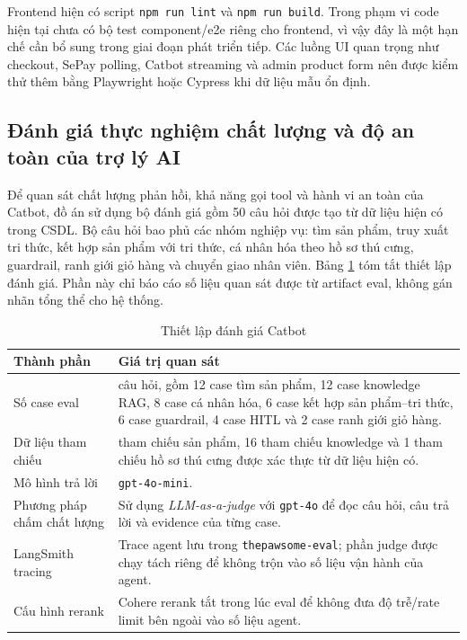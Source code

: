 \documentclass[../DoAn.tex]{subfiles}
\begin{document}
Frontend hiện có script \texttt{npm run lint} và \texttt{npm run build}. Trong phạm vi code hiện tại chưa có bộ test component/e2e riêng cho frontend, vì vậy đây là một hạn chế cần bổ sung trong giai đoạn phát triển tiếp. Các luồng UI quan trọng như checkout, SePay polling, Catbot streaming và admin product form nên được kiểm thử thêm bằng Playwright hoặc Cypress khi dữ liệu mẫu ổn định.

\subsection{Đánh giá thực nghiệm chất lượng và độ an toàn của trợ lý AI}
\label{subsection:4.4.2}

Để quan sát chất lượng phản hồi, khả năng gọi tool và hành vi an toàn của Catbot, đồ án sử dụng bộ đánh giá gồm 50 câu hỏi được tạo từ dữ liệu hiện có trong CSDL. Bộ câu hỏi bao phủ các nhóm nghiệp vụ: tìm sản phẩm, truy xuất tri thức, kết hợp sản phẩm với tri thức, cá nhân hóa theo hồ sơ thú cưng, guardrail, ranh giới giỏ hàng và chuyển giao nhân viên. Bảng \ref{table:4.eval_setup} tóm tắt thiết lập đánh giá. Phần này chỉ báo cáo số liệu quan sát được từ artifact eval, không gán nhãn tổng thể cho hệ thống.

\begin{table}[H]
\centering
\small
\renewcommand{\arraystretch}{1.25}
\caption{Thiết lập đánh giá Catbot}
\label{table:4.eval_setup}
\begin{tabularx}{\linewidth}{|>{\raggedright\arraybackslash}p{4.4cm}|>{\raggedright\arraybackslash}X|}
\hline
\textbf{Thành phần} & \textbf{Giá trị quan sát} \\ \hline
Số case eval & 50 câu hỏi, gồm 12 case tìm sản phẩm, 12 case knowledge RAG, 8 case cá nhân hóa, 6 case kết hợp sản phẩm--tri thức, 6 case guardrail, 4 case HITL và 2 case ranh giới giỏ hàng. \\ \hline
Dữ liệu tham chiếu & 17 tham chiếu sản phẩm, 16 tham chiếu knowledge và 1 tham chiếu hồ sơ thú cưng được xác thực từ dữ liệu hiện có. \\ \hline
Mô hình trả lời & \texttt{gpt-4o-mini}. \\ \hline
Phương pháp chấm chất lượng & Sử dụng \textit{LLM-as-a-judge} với \texttt{gpt-4o} để đọc câu hỏi, câu trả lời và evidence của từng case. \\ \hline
LangSmith tracing & Trace agent lưu trong \texttt{thepawsome-eval}; phần judge được chạy tách riêng để không trộn vào số liệu vận hành của agent. \\ \hline
Cấu hình rerank & Cohere rerank tắt trong lúc eval để không đưa độ trễ/rate limit bên ngoài vào số liệu agent. \\ \hline
\end{tabularx}
\end{table}
\end{document}
